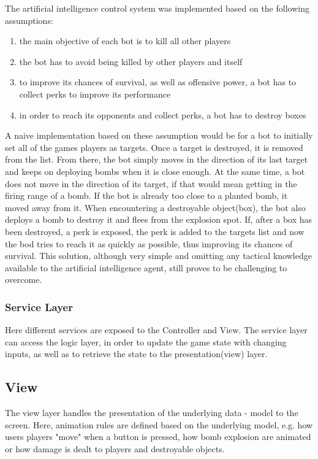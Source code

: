 \documentclass[]{article}
\begin{document}
The artificial intelligence control system was implemented based on the following assumptions:
\begin{enumerate}
\item the main objective of each bot is to kill all other players
\item the bot has to avoid being killed by other players and itself
\item to improve its chances of survival, as well as offensive power, a bot has to collect perks to improve its performance
\item in order to reach its opponents and collect perks, a bot has to destroy boxes
\end{enumerate}
A naive implementation based on these assumption would be for a bot to initially set all of the games players as targets. Once a target is destroyed, it is removed from the list. From there, the bot simply moves in the direction of its last target and keeps on deploying bombs when it is close enough. At the same time, a bot does not move in the direction of its target, if that would mean getting in the firing range of a bomb. If the bot is already too close to a planted bomb, it moved away from it. When encountering a destroyable object(box), the bot also deploys a bomb to destroy it and flees from the explosion spot.
If, after a box has been destroyed, a perk is exposed, the perk is added to the targets list and now the bod tries to reach it as quickly as possible, thus improving its chances of survival.
This solution, although very simple and omitting any tactical knowledge available to the artificial intelligence agent, still proves to be challenging to overcome.


\subsubsection{Service Layer}
Here different services are exposed to the Controller and View. The service layer can access the logic layer, in order to update the game state with changing inputs, as well as to retrieve the state to the presentation(view) layer.

\subsection{View}
The view layer handles the presentation of the underlying data - model to the screen. Here, animation rules are defined based on the underlying model, e.g. how users players "move" when a button is pressed, how bomb explosion are animated or how damage is dealt to players and destroyable objects.
\end{document}
